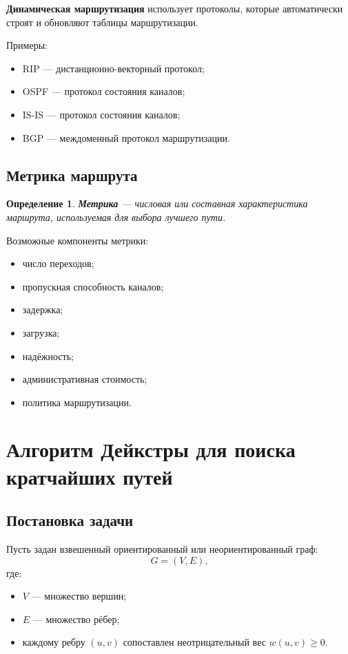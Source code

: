 \documentclass[12pt,a4paper]{article}
\newtheorem{definition}{Определение}
\begin{document}
\textbf{Динамическая маршрутизация} использует протоколы, которые автоматически строят и обновляют таблицы маршрутизации.

Примеры:
\begin{itemize}
    \item RIP --- дистанционно-векторный протокол;
    \item OSPF --- протокол состояния каналов;
    \item IS-IS --- протокол состояния каналов;
    \item BGP --- междоменный протокол маршрутизации.
\end{itemize}

\subsection{Метрика маршрута}

\begin{definition}
\textbf{Метрика} --- числовая или составная характеристика маршрута, используемая для выбора лучшего пути.
\end{definition}

Возможные компоненты метрики:
\begin{itemize}
    \item число переходов;
    \item пропускная способность каналов;
    \item задержка;
    \item загрузка;
    \item надёжность;
    \item административная стоимость;
    \item политика маршрутизации.
\end{itemize}

\section{Алгоритм Дейкстры для поиска кратчайших путей}

\subsection{Постановка задачи}

Пусть задан взвешенный ориентированный или неориентированный граф:
\[
G = (V,E),
\]
где:
\begin{itemize}
    \item $V$ --- множество вершин;
    \item $E$ --- множество рёбер;
    \item каждому ребру $(u,v)$ сопоставлен неотрицательный вес $w(u,v) \geq 0$.
\end{itemize}
\end{document}
